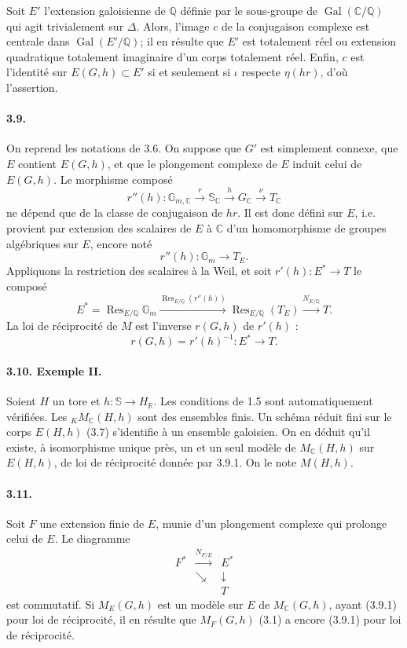 \documentclass[10pt]{article}
\newcommand{\C}{\mathbb C}
\newcommand{\Gm}{\mathbb G_m}
\newcommand{\Q}{\mathbb Q}
\newcommand{\R}{\mathbb R}
\newcommand{\bS}{\mathbb S}
\newcommand{\Gal}{\operatorname{Gal}}
\newcommand{\MC}{M_{\C}}
\newcommand{\Res}{\operatorname{Res}}
\begin{document}
Soit $E'$ l'extension galoisienne de $\Q$ définie par le sous-groupe de $\Gal(\C/\Q)$ qui agit trivialement sur $\Delta$. Alors, l'image $c$ de la conjugaison complexe est centrale dans $\Gal(E'/\Q)$; il en résulte que $E'$ est totalement réel ou extension quadratique totalement imaginaire d'un corps totalement réel. Enfin, $c$ est l'identité sur $E(G,h)\subset E'$ si et seulement si $\iota$ respecte $\eta(hr)$, d'où l'assertion.

\paragraph{3.9.} On reprend les notations de 3.6. On suppose que $G'$ est simplement connexe, que $E$ contient $E(G,h)$, et que le plongement complexe de $E$ induit celui de $E(G,h)$. Le morphisme composé
\[
r''(h):\mathbb G_{m,\C}\xrightarrow{r}\bS_\C\xrightarrow{h}G_\C\xrightarrow{\nu}T_\C
\]
ne dépend que de la classe de conjugaison de $hr$. Il est donc défini sur $E$, i.e. provient par extension des scalaires de $E$ à $\C$ d'un homomorphisme de groupes algébriques sur $E$, encore noté
\[
r''(h):\Gm\longrightarrow T_E.
\]
Appliquons la restriction des scalaires à la Weil, et soit $r'(h):E^*\to T$ le composé
\[
E^*=\Res_{E/\Q}\Gm\xrightarrow{\Res_{E/\Q}(r''(h))}\Res_{E/\Q}(T_E)\xrightarrow{N_{E/\Q}}T.
\]
La loi de réciprocité de $M$ est l'inverse $r(G,h)$ de $r'(h)$ :
\[
r(G,h)=r'(h)^{-1}:E^*\longrightarrow T .\tag{3.9.1}
\]

\paragraph{3.10. Exemple II.} Soient $H$ un tore et $h:\bS\to H_\R$. Les conditions de 1.5 sont automatiquement vérifiées. Les ${}_K\MC(H,h)$ sont des ensembles finis. Un schéma réduit fini sur le corps $E(H,h)$ (3.7) s'identifie à un ensemble galoisien. On en déduit qu'il existe, à isomorphisme unique près, un et un seul modèle de $\MC(H,h)$ sur $E(H,h)$, de loi de réciprocité donnée par 3.9.1. On le note $M(H,h)$.

\paragraph{3.11.} Soit $F$ une extension finie de $E$, munie d'un plongement complexe qui prolonge celui de $E$. Le diagramme
\[
\begin{array}{ccc}
F^*&\xrightarrow{N_{F/E}}&E^*\\
&\searrow&\downarrow\\
&&T
\end{array}
\]
est commutatif. Si $M_E(G,h)$ est un modèle sur $E$ de $\MC(G,h)$, ayant (3.9.1) pour loi de réciprocité, il en résulte que $M_F(G,h)$ (3.1) a encore (3.9.1) pour loi de réciprocité.
\end{document}
